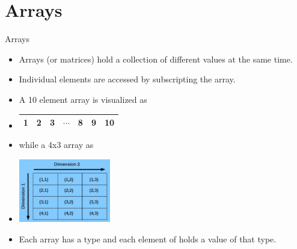 \documentclass[c,mathserif,compress,xcolor=svgnames]{beamer}
\begin{document}
\section{Arrays}
\begin{frame}{Arrays}
  \begin{itemize}
    \item Arrays (or matrices) hold a collection of different values at the same time.
    \item Individual elements are accessed by subscripting the array.
    \item A 10 element array is visualized as
    \item[]
      \begin{center}
        \begin{tabular}{|c|c|c|c|c|c|c|}
          \hline
          1 & 2 & 3 & $\cdots$ & 8 & 9 & 10 \\
          \hline
        \end{tabular}
      \end{center}
    \item[] while a 4x3 array as
    \item[]
      \begin{center}
        \includegraphics[width=4cm]{./graphics/array1}
      \end{center}
    \item Each array has a type and each element of holds a value of that type.
  \end{itemize}
\end{frame} 
\end{document}
